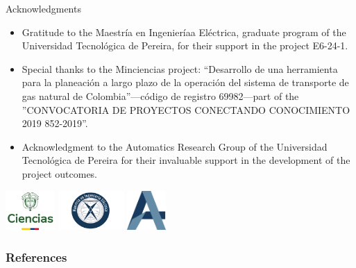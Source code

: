 \documentclass[hyperref={colorlinks,citecolor=blue,linkcolor=blue,urlcolor=blue}]{beamer}
\begin{document}
\begin{frame}{Acknowledgments}
    \begin{itemize}
        \item Gratitude to the Maestría en Ingenieríaa Eléctrica, graduate program of the Universidad Tecnológica de Pereira, for their support in the project E6-24-1.
        \item Special thanks to the Minciencias project: “Desarrollo de una herramienta para la planeación a largo plazo de la operación del sistema de transporte de gas natural de Colombia”—código de registro 69982—part of the ”CONVOCATORIA DE PROYECTOS CONECTANDO CONOCIMIENTO 2019 852-2019”.
        \item Acknowledgment to the Automatics Research Group of the Universidad Tecnológica de Pereira for their invaluable support in the development of the project outcomes.
    \end{itemize}

    \vfill %
    \begin{center}
        \includegraphics[height=1.5cm]{figures/logos/minciencias_logo.png}
        \includegraphics[height=1.5cm]{figures/logos/mie.jpg} 
        \includegraphics[height=1.5cm]{figures/logos/automatica.jpeg}
    \end{center}
\end{frame}


\begin{frame}[allowframebreaks]
        \frametitle{References}
        
        
\end{frame}
\end{document}
